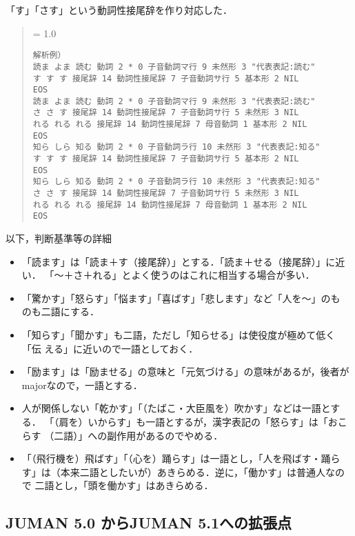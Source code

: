 \documentclass[a4j,titlepage]{jarticle}
\begin{document}
「す」「さす」という動詞性接尾辞を作り対応した．

\begin{quote}
{\baselineskip = 1.0 \baselineskip
\begin{verbatim}
解析例）
読ま よま 読む 動詞 2 * 0 子音動詞マ行 9 未然形 3 "代表表記:読む"
す す す 接尾辞 14 動詞性接尾辞 7 子音動詞サ行 5 基本形 2 NIL
EOS
読ま よま 読む 動詞 2 * 0 子音動詞マ行 9 未然形 3 "代表表記:読む"
さ さ す 接尾辞 14 動詞性接尾辞 7 子音動詞サ行 5 未然形 3 NIL
れる れる れる 接尾辞 14 動詞性接尾辞 7 母音動詞 1 基本形 2 NIL
EOS
知ら しら 知る 動詞 2 * 0 子音動詞ラ行 10 未然形 3 "代表表記:知る"
す す す 接尾辞 14 動詞性接尾辞 7 子音動詞サ行 5 基本形 2 NIL
EOS
知ら しら 知る 動詞 2 * 0 子音動詞ラ行 10 未然形 3 "代表表記:知る"
さ さ す 接尾辞 14 動詞性接尾辞 7 子音動詞サ行 5 未然形 3 NIL
れる れる れる 接尾辞 14 動詞性接尾辞 7 母音動詞 1 基本形 2 NIL
EOS
\end{verbatim}
}
\end{quote}

以下，判断基準等の詳細

\begin{itemize}
 \item 「読ます」は「読ま＋す（接尾辞）」とする．「読ま＋せる（接尾辞）」に近い．
「〜＋さ＋れる」とよく使うのはこれに相当する場合が多い．

 \item 「驚かす」「怒らす」「悩ます」「喜ばす」「悲します」など「人を〜」のも
のも二語にする．

 \item 「知らす」「聞かす」も二語，ただし「知らせる」は使役度が極めて低く「伝
える」に近いので一語としておく．

 \item 「励ます」は「励ませる」の意味と「元気づける」の意味があるが，後者が
majorなので，一語とする．

 \item 人が関係しない「乾かす」「（たばこ・大臣風を）吹かす」などは一語とする．
「（肩を）いからす」も一語とするが，漢字表記の「怒らす」は「おこらす
（二語）」への副作用があるのでやめる．

 \item 「（飛行機を）飛ばす」「（心を）踊らす」は一語とし，「人を飛ばす・踊ら
す」は（本来二語としたいが）あきらめる．逆に，「働かす」は普通人なので
二語とし，「頭を働かす」はあきらめる．
\end{itemize}


\subsection{JUMAN 5.0 からJUMAN 5.1への拡張点}
\label{subsec:5.1}
\end{document}
